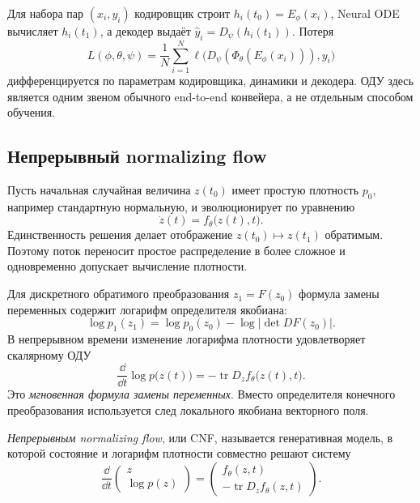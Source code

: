 \begin{application}
Для набора пар $(x_i,y_i)$ кодировщик строит $h_i(t_0)=E_\phi(x_i)$, Neural ODE вычисляет $h_i(t_1)$, а декодер выдаёт $\widehat y_i=D_\psi(h_i(t_1))$. Потеря
\[
L(\phi,\theta,\psi)
=
\frac1N\sum_{i=1}^{N}
\ell\bigl(D_\psi(\Phi_\theta(E_\phi(x_i))),y_i\bigr)
\]
дифференцируется по параметрам кодировщика, динамики и декодера. ОДУ здесь является одним звеном обычного end-to-end конвейера, а не отдельным способом обучения.
\end{application}

\subsection{Непрерывный normalizing flow}

Пусть начальная случайная величина $z(t_0)$ имеет простую плотность $p_0$, например стандартную нормальную, и эволюционирует по уравнению
\begin{equation}
\label{eq:cnf-state-v06}
\dot z(t)=f_\theta\bigl(z(t),t\bigr).
\end{equation}
Единственность решения делает отображение $z(t_0)\mapsto z(t_1)$ обратимым. Поэтому поток переносит простое распределение в более сложное и одновременно допускает вычисление плотности.

Для дискретного обратимого преобразования $z_1=F(z_0)$ формула замены переменных содержит логарифм определителя якобиана:
\[
\log p_1(z_1)
=
\log p_0(z_0)
-
\log\left|\det D F(z_0)\right|.
\]
В непрерывном времени изменение логарифма плотности удовлетворяет скалярному ОДУ
\begin{equation}
\label{eq:instantaneous-change-of-variables-v06}
\frac{\dd}{\dd t}\log p\bigl(z(t)\bigr)
=
-\operatorname{tr}
D_zf_\theta\bigl(z(t),t\bigr).
\end{equation}
Это
\emph{мгновенная формула замены переменных}. Вместо определителя конечного преобразования используется след локального якобиана векторного поля.

\begin{definition}
\emph{Непрерывным normalizing flow}, или CNF, называется генеративная модель, в которой состояние и логарифм плотности совместно решают систему
\begin{equation}
\label{eq:cnf-augmented-v06}
\frac{\dd}{\dd t}
\begin{pmatrix}
z\\
\log p(z)
\end{pmatrix}
=
\begin{pmatrix}
f_\theta(z,t)\\
-\operatorname{tr}D_zf_\theta(z,t)
\end{pmatrix}.
\end{equation}
\end{definition}

